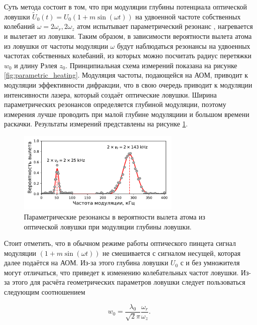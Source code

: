 Суть метода состоит в том, что при модуляции глубины потенциала оптической ловушки $\tilde{U}_0(t) = U_0 (1 + m \sin(\omega t))$ на удвоенной частоте собственных колебаний $\omega = 2\omega_r, 2\omega_z$ атом испытывает параметрический резонанс \cite{LL_mechanics}, нагревается и вылетает из ловушки. Таким образом, в зависимости вероятности вылета атома из ловушки от частоты модуляции $\omega$ будут наблюдаться резонансы на удвоенных частотах собственных колебаний, из которых можно посчитать радиус перетяжки $w_0$ и длину Рэлея $z_0$. Принципиальная схема измерений показана на рисунке \ref{fig:parametric_heating}. Модуляция частоты, подающейся на АОМ, приводит к модуляции эффективности дифракции, что в свою очередь приводит к модуляции интенсивности лазера, который создаёт оптические ловушки. Ширина параметрических резонансов определяется глубиной модуляции, поэтому измерения лучше проводить при малой глубине модуляциии и большом времени раскачки. Результаты измерений представлены на рисунке \ref{fig:oscillation_frequencies}. 

\begin{figure}[H]
	\centering
	\includegraphics[width=0.7\textwidth]{images/oscillation_frequencies.pdf}
	\caption{Параметрические резонансы в вероятности вылета атома из оптической ловушки при модуляции глубины ловушки.}
	\label{fig:oscillation_frequencies}
\end{figure}

Стоит отметить, что в обычном режиме работы оптического пинцета сигнал модуляции $(1+m\sin(\omega t))$ не смешивается с сигналом несущей, которая далее подаётся на АОМ. Из-за этого глубина ловушки $U_0$ с и без умножителя могут отличаться, что приведет к изменению колебательных частот ловушки. Из-за этого для расчёта геометрических параметров ловушки следует пользоваться следующим соотношением

\begin{equation}
	w_0 = \frac{\lambda_0}{\sqrt{2}\pi}\frac{\omega_r}{\omega_z}.
	\label{eq:w0}
\end{equation}


